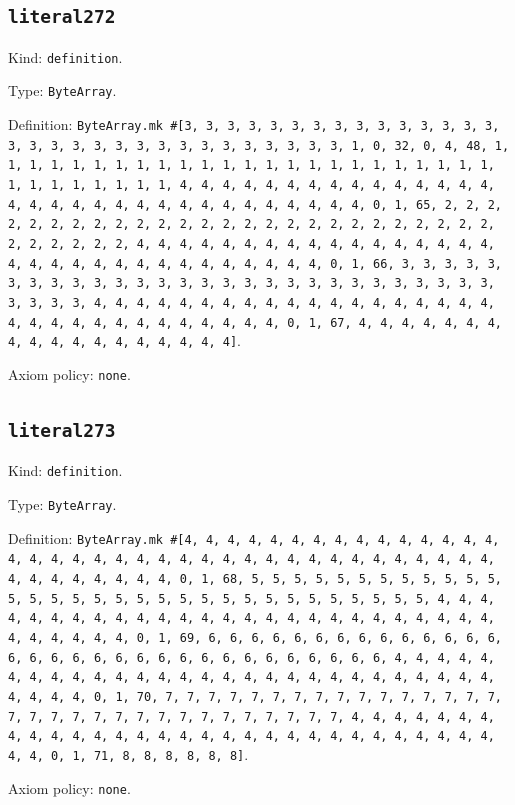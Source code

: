 \documentclass[11pt]{article}
\begin{document}
\subsection*{\texttt{literal272}}
\noindent Kind: \texttt{definition}.\par
\noindent Type: \texttt{ByteArray}.\par
\noindent Definition: \texttt{ByteArray.mk \#[3, 3, 3, 3, 3, 3, 3, 3, 3, 3, 3, 3, 3, 3, 3, 3, 3, 3, 3, 3, 3, 3, 3, 3, 3, 3, 3, 3, 3, 3, 3, 1, 0, 32, 0, 4, 48, 1, 1, 1, 1, 1, 1, 1, 1, 1, 1, 1, 1, 1, 1, 1, 1, 1, 1, 1, 1, 1, 1, 1, 1, 1, 1, 1, 1, 1, 1, 1, 1, 4, 4, 4, 4, 4, 4, 4, 4, 4, 4, 4, 4, 4, 4, 4, 4, 4, 4, 4, 4, 4, 4, 4, 4, 4, 4, 4, 4, 4, 4, 4, 4, 0, 1, 65, 2, 2, 2, 2, 2, 2, 2, 2, 2, 2, 2, 2, 2, 2, 2, 2, 2, 2, 2, 2, 2, 2, 2, 2, 2, 2, 2, 2, 2, 2, 2, 2, 4, 4, 4, 4, 4, 4, 4, 4, 4, 4, 4, 4, 4, 4, 4, 4, 4, 4, 4, 4, 4, 4, 4, 4, 4, 4, 4, 4, 4, 4, 4, 4, 0, 1, 66, 3, 3, 3, 3, 3, 3, 3, 3, 3, 3, 3, 3, 3, 3, 3, 3, 3, 3, 3, 3, 3, 3, 3, 3, 3, 3, 3, 3, 3, 3, 3, 3, 4, 4, 4, 4, 4, 4, 4, 4, 4, 4, 4, 4, 4, 4, 4, 4, 4, 4, 4, 4, 4, 4, 4, 4, 4, 4, 4, 4, 4, 4, 4, 4, 0, 1, 67, 4, 4, 4, 4, 4, 4, 4, 4, 4, 4, 4, 4, 4, 4, 4, 4, 4, 4]}.\par
\noindent Axiom policy: \texttt{none}.\par
\subsection*{\texttt{literal273}}
\noindent Kind: \texttt{definition}.\par
\noindent Type: \texttt{ByteArray}.\par
\noindent Definition: \texttt{ByteArray.mk \#[4, 4, 4, 4, 4, 4, 4, 4, 4, 4, 4, 4, 4, 4, 4, 4, 4, 4, 4, 4, 4, 4, 4, 4, 4, 4, 4, 4, 4, 4, 4, 4, 4, 4, 4, 4, 4, 4, 4, 4, 4, 4, 4, 4, 4, 4, 0, 1, 68, 5, 5, 5, 5, 5, 5, 5, 5, 5, 5, 5, 5, 5, 5, 5, 5, 5, 5, 5, 5, 5, 5, 5, 5, 5, 5, 5, 5, 5, 5, 5, 5, 4, 4, 4, 4, 4, 4, 4, 4, 4, 4, 4, 4, 4, 4, 4, 4, 4, 4, 4, 4, 4, 4, 4, 4, 4, 4, 4, 4, 4, 4, 4, 4, 0, 1, 69, 6, 6, 6, 6, 6, 6, 6, 6, 6, 6, 6, 6, 6, 6, 6, 6, 6, 6, 6, 6, 6, 6, 6, 6, 6, 6, 6, 6, 6, 6, 6, 6, 4, 4, 4, 4, 4, 4, 4, 4, 4, 4, 4, 4, 4, 4, 4, 4, 4, 4, 4, 4, 4, 4, 4, 4, 4, 4, 4, 4, 4, 4, 4, 4, 0, 1, 70, 7, 7, 7, 7, 7, 7, 7, 7, 7, 7, 7, 7, 7, 7, 7, 7, 7, 7, 7, 7, 7, 7, 7, 7, 7, 7, 7, 7, 7, 7, 7, 7, 4, 4, 4, 4, 4, 4, 4, 4, 4, 4, 4, 4, 4, 4, 4, 4, 4, 4, 4, 4, 4, 4, 4, 4, 4, 4, 4, 4, 4, 4, 4, 4, 0, 1, 71, 8, 8, 8, 8, 8, 8]}.\par
\noindent Axiom policy: \texttt{none}.\par
\end{document}
